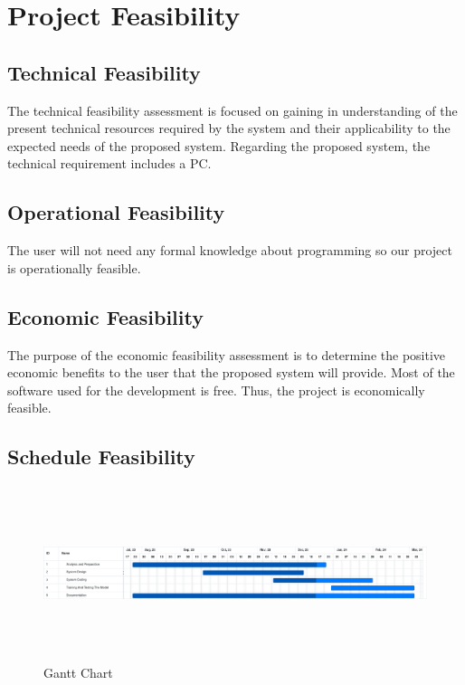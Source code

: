 \section{Project Feasibility}
\vspace{-18pt}
\subsection{Technical Feasibility}
\vspace{-18pt}
The technical feasibility assessment is focused on gaining in understanding of the present technical resources required by the system and their applicability to the expected needs of the proposed system. Regarding the proposed system, the technical requirement includes a PC.
\vspace{-18pt}
\subsection{Operational Feasibility}
\vspace{-18pt}
The user will not need any formal knowledge about programming so our project is operationally feasible.
\vspace{-18pt}
\subsection{Economic Feasibility}
\vspace{-18pt}
The purpose of the economic feasibility assessment is to determine the positive economic benefits to the user that the proposed system will provide. Most of the software used for the development is free. Thus, the project is economically feasible.
\vspace{-18pt}
\subsection{Schedule Feasibility}
\begin{figure}[!h] %
\begin{center}
	\includegraphics[width=6in,height=2in
	]{images/real_n.png} 
	\caption{Gantt Chart} %
	\label{figGanttChart} %
\end{center}
\end{figure}
